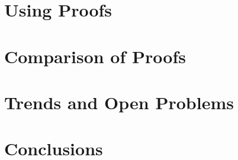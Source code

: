 \documentclass{llncs}
\begin{document}
\section{Using Proofs}







\section{Comparison of Proofs}




\section{Trends and Open Problems}



\section{Conclusions}






\end{document}
